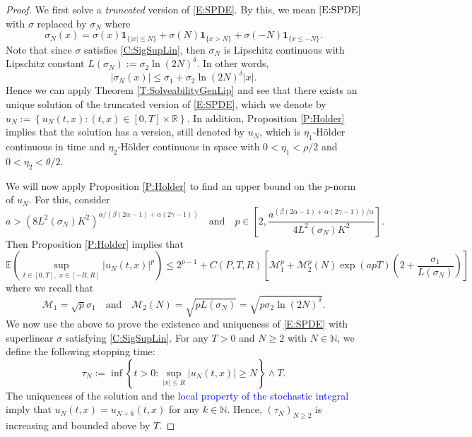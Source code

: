 \documentclass[a4paper,11pt]{article}
\numberwithin{equation}{section}
\theoremstyle{plain}
\theoremstyle{definition}
\newcommand{\R}{\mathbb{R}}
\numberwithin{NQ}{section}
\numberwithin{LQ}{section}
\numberwithin{ZQ}{section}
\begin{document}
	\begin{proof}
We first solve a {\it truncated} version of \eqref{E:SPDE}. By this, we mean $\eqref{E:SPDE}$ with $\sigma$ replaced by $\sigma_N$ where 
	\[
		\sigma_N(x) = \sigma(x)\textbf{1}_{\{|x| \le N\}} + \sigma(N)\textbf{1}_{\{x  >N\}} + \sigma(-N)\textbf{1}_{\{x \le -N\}}.
	\]
Note that since $\sigma$ satisfies \eqref{C:SigSupLin}, then $\sigma_N$ is Lipschitz continuous with Lipschitz constant $L(\sigma_N) := \sigma_2 \ln(2N)^{\delta}$. In other words, 
	\[
		|\sigma_N(x)| \le \sigma_1 + \sigma_2 \ln(2N)^{\delta}|x|.
	\]
Hence we can apply Theorem \ref{T:SolveabilityGenLip} and see that there exists an unique solution of the truncated version of \eqref{E:SPDE}, which we denote by $u_N := \left\{ u_N(t,x) : (t,x) \in [0,T] \times \R \right\}$. In addition, Proposition \ref{P:Holder} implies that the solution has a version, still denoted by $u_N$, which is $\eta_1$-H\"older continuous in time and $\eta_2$-H\"older continuous in space  with $0<\eta_1 < \rho/2$ and $0<\eta_2 < \theta/2$.

We will now apply Proposition \ref{P:Holder} to find an upper bound on the $p$-norm of $u_N$. For this, consider 
	\[
		a > \left( 8 L^2(\sigma_N) K^2 \right)^{\alpha/(\beta(2\alpha-1)+\alpha(2\gamma-1))} \quad \text{and} \quad p \in \left[ 2, \frac{a^{ (\beta(2\alpha-1)+\alpha(2\gamma-1))/\alpha}}{4L^2(\sigma_N)K^2} \right].
	\] 
Then Proposition \ref{P:Holder} implies that 
	\begin{equation}
	\label{E:u_NMomBdd}
		\mathbb{E}\left(\sup_{t\in[0,T],\; x\in[-R,R]} |u_N(t,x)|^p\right) \le 2^{p-1} + C(P,T,R)\left[\mathcal{M}_1^p + \mathcal{M}_2^p(N) \exp(apT)\left(2+ \frac{\sigma_1}{L(\sigma_N)}\right)\right]
	\end{equation}
where we recall that 
	\begin{equation}
	\label{D:M1&2forSig_N}
		\mathcal{M}_1 = \sqrt{p}\sigma_1 \quad \text{and} \quad \mathcal{M}_2(N) = \sqrt{pL(\sigma_N)} = \sqrt{p\sigma_2\ln(2N)^\delta}.
	\end{equation}
We now use the above to prove the existence and uniqueness of \eqref{E:SPDE} with superlinear $\sigma$ satisfying \eqref{C:SigSupLin}. For any $T>0$ and $N \ge 2$ with $N\in \mathbb{N}$, we define the following stopping time:
	\begin{equation}
		\tau_N := \inf \left\{ t>0 : \sup_{|x| \le R} |u_N(t,x)| \ge N \right\} \wedge T.
	\end{equation}
The uniqueness of the solution and the \textcolor{blue}{local property of the stochastic integral} imply that $u_N(t,x) = u_{N+k}(t,x)$ for any $k \in \mathbb{N}$. Hence, $(\tau_N)_{N \ge 2}$ is increasing and bounded above by $T$. 


\end{proof}
\end{document}
